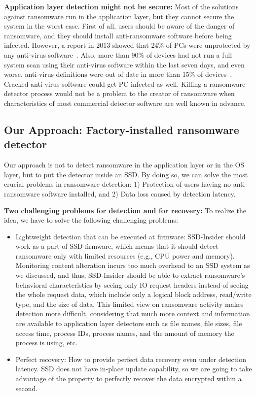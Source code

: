 \documentclass[conference]{IEEEtran}
\newcommand{\eg}{e.g.,\xspace}
\newcommand{\ours}{SSD-Insider}
\begin{document}
{\bf Application layer detection might not be secure:}
Most of the solutions against ransomware run in the application
layer, but they cannot secure the system in the worst case.  First
of all, users should be aware of the danger of ransomware, and they
should install anti-ransomware software before being infected.
However, a report in 2013 showed that 24\% of PCs were unprotected
by any anti-virus software~\cite{unprotected}.  Also, more than
90\% of devices had not run a full system scan using their
anti-virus software within the last seven days, and even worse,
anti-virus definitions were out of date in more than 15\% of
devices~\cite{antivirus}. Cracked anti-virus software could get PC
infected as well.  Killing a ransomware detector process would not
be a problem to the creator of ransomware when characteristics of
most commercial detector software are well known in advance.

\subsection{Our Approach: Factory-installed ransomware detector}
Our approach is not to detect ransomware in the application layer or in
the OS layer, but to put the detector inside an SSD. By doing so,
we can solve the most crucial problems in ransomware detection: 
1) Protection of users having no anti-ransomware software installed, 
and 2) Data loss caused by detection latency.

{\bf Two challenging problems for detection and for recovery:}
To realize the idea, we have to solve the following challenging
problems: 
\begin{itemize}
    \item Lightweight detection that can be executed at firmware: 
    \ours{} should work as a part of SSD firmware, which means that it should
    detect ransomware only with limited resources (\eg CPU power and memory). 
    Monitoring content alteration incurs too much overhead to an SSD system as we discussed,
    and thus, \ours{} should be able to extract ransomware's behavioral characteristics
    by seeing only IO request headers instead of seeing the whole request data, 
    which include only a logical block address, read/write type, and the size of data. 
    This limited view on ransomware activity makes detection more difficult,
    considering that much more context and information are available to application layer detectors 
    such as file names, file sizes, file access time, process IDs, process names, and the amount of memory 
    the process is using, etc. 
    \item Perfect recovery: How to provide perfect data recovery even under detection latency. 
    SSD does not have in-place update capability, so we are going to take advantage of the property
    to perfectly recover the data encrypted within a second.
\end{itemize}
\end{document}
